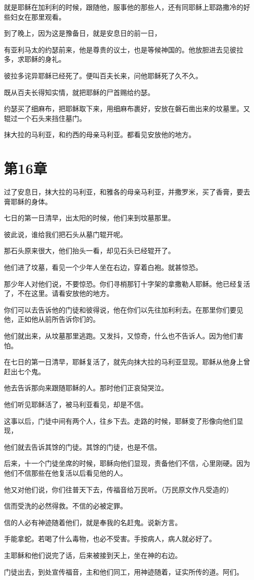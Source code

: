 \documentclass[12pt,oneside]{book}
\begin{document}
就是耶稣在加利利的时候，跟随他，服事他的那些人，还有同耶稣上耶路撒冷的好些妇女在那里观看。

到了晚上，因为这是豫备日，就是安息日的前一日，

有亚利马太的约瑟前来，他是尊贵的议士，也是等候神国的。他放胆进去见彼拉多，求耶稣的身礼。

彼拉多诧异耶稣已经死了。便叫百夫长来，问他耶稣死了久不久。

既从百夫长得知实情，就把耶稣的尸首赐给约瑟。

约瑟买了细麻布，把耶稣取下来，用细麻布裹好，安放在磐石凿出来的坟墓里。又辊过一个石头来挡住墓门。

抹大拉的马利亚，和约西的母亲马利亚。都看见安放他的地方。

\chapter{第16章}
过了安息日，抹大拉的马利亚，和雅各的母亲马利亚，并撒罗米，买了香膏，要去膏耶稣的身体。

七日的第一日清早，出太阳的时候，他们来到坟墓那里。

彼此说，谁给我们把石头从墓门辊开呢。

那石头原来很大，他们抬头一看，却见石头已经辊开了。

他们进了坟墓，看见一个少年人坐在右边，穿着白袍。就甚惊恐。

那少年人对他们说，不要惊恐。你们寻梢那钉十字架的拿撒勒人耶稣。他已经复活了，不在这里。请看安放他的地方。

你们可以去告诉他的门徒和彼得说，他在你们以先往加利利去。在那里你们要见他，正如他从前所告诉你们的。

他们就出来，从坟墓那里逃跑。又发抖，又惊奇，什么也不告诉人。因为他们害怕。

在七日的第一日清早，耶稣复活了，就先向抹大拉的马利亚显现。耶稣从他身上曾赶出七个鬼。

他去告诉那向来跟随耶稣的人。那时他们正哀恸哭泣。

他们听见耶稣活了，被马利亚看见，却是不信。

这事以后，门徒中间有两个人，往乡下去。走路的时候，耶稣变了形像向他们显现，

他们就去告诉其馀的门徒。其馀的门徒，也是不信。

后来，十一个门徒坐席的时候，耶稣向他们显现，责备他们不信，心里刚硬。因为他们不信那些在他复活以后看见他的人。

他又对他们说，你们往普天下去，传福音给万民听。（万民原文作凡受造的）

信而受洗的必然得救。不信的必被定罪。

信的人必有神迹随着他们，就是奉我的名赶鬼。说新方言。

手能拿蛇。若喝了什么毒物，也必不受害。手按病人，病人就必好了。

主耶稣和他们说完了话，后来被接到天上，坐在神的右边。

门徒出去，到处宣传福音，主和他们同工，用神迹随着，证实所传的道。阿们。



\backmatter
\end{document}
